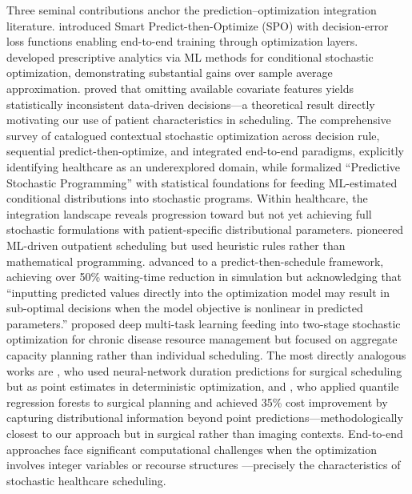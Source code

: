 \documentclass[11pt,a4paper]{article}
\begin{document}
Three seminal contributions anchor the prediction--optimization integration literature. \citet{elmachtoub2022smart} introduced Smart Predict-then-Optimize (SPO) with decision-error loss functions enabling end-to-end training through optimization layers. \citet{bertsimas2020predictive} developed prescriptive analytics via ML methods for conditional stochastic optimization, demonstrating substantial gains over sample average approximation. \citet{ban2019big} proved that omitting available covariate features yields statistically inconsistent data-driven decisions---a theoretical result directly motivating our use of patient characteristics in scheduling. The comprehensive survey of \citet{sadana2025contextual} catalogued contextual stochastic optimization across decision rule, sequential predict-then-optimize, and integrated end-to-end paradigms, explicitly identifying healthcare as an underexplored domain, while \citet{deng2022predictive} formalized ``Predictive Stochastic Programming'' with statistical foundations for feeding ML-estimated conditional distributions into stochastic programs. Within healthcare, the integration landscape reveals progression toward but not yet achieving full stochastic formulations with patient-specific distributional parameters. \citet{srinivas2018prescriptive} pioneered ML-driven outpatient scheduling but used heuristic rules rather than mathematical programming. \citet{salah2022predict} advanced to a predict-then-schedule framework, achieving over 50\% waiting-time reduction in simulation but acknowledging that ``inputting predicted values directly into the optimization model may result in sub-optimal decisions when the model objective is nonlinear in predicted parameters.'' \citet{olya2022integrated} proposed deep multi-task learning feeding into two-stage stochastic optimization for chronic disease resource management but focused on aggregate capacity planning rather than individual scheduling. The most directly analogous works are \citet{gower2025predict}, who used neural-network duration predictions for surgical scheduling but as point estimates in deterministic optimization, and \citet{rottmann2025case}, who applied quantile regression forests to surgical planning and achieved 35\% cost improvement by capturing distributional information beyond point predictions---methodologically closest to our approach but in surgical rather than imaging contexts. End-to-end approaches face significant computational challenges when the optimization involves integer variables or recourse structures \citep{mandi2024decision}---precisely the characteristics of stochastic healthcare scheduling.
\end{document}
